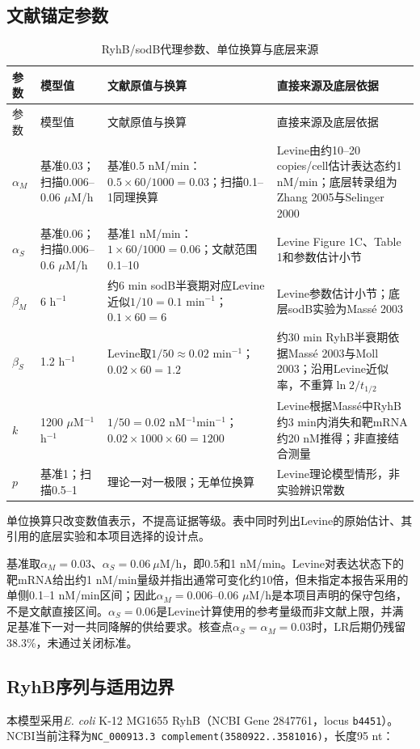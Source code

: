 \documentclass[UTF8,a4paper,11pt,fontset=windows]{ctexart}
\begin{document}
\subsection{文献锚定参数}
{\footnotesize
\begin{longtable}{@{}p{}p{}p{}p{}@{}}
\caption{RyhB/sodB代理参数、单位换算与底层来源}\\
\toprule
参数 & 模型值 & 文献原值与换算 & 直接来源及底层依据\\
\midrule
\endfirsthead
\toprule
参数 & 模型值 & 文献原值与换算 & 直接来源及底层依据\\\midrule
\endhead
$\alpha_M$ & 基准0.03；扫描0.006--0.06 $\mu$M/h & 基准0.5 nM/min：$0.5\times60/1000=0.03$；扫描0.1--1同理换算 & Levine由约10--20 copies/cell估计表达态约1 nM/min；底层转录组为Zhang 2005与Selinger 2000\\
$\alpha_S$ & 基准0.06；扫描0.006--0.6 $\mu$M/h & 基准1 nM/min：$1\times60/1000=0.06$；文献范围0.1--10 & Levine Figure 1C、Table 1和参数估计小节\\
$\beta_M$ & 6 h$^{-1}$ & 约6 min sodB半衰期对应Levine近似$1/10=0.1$ min$^{-1}$；$0.1\times60=6$ & Levine参数估计小节；底层sodB实验为Massé 2003\\
$\beta_S$ & 1.2 h$^{-1}$ & Levine取$1/50\approx0.02$ min$^{-1}$；$0.02\times60=1.2$ & 约30 min RyhB半衰期依据Massé 2003与Moll 2003；沿用Levine近似率，不重算$\ln2/t_{1/2}$\\
$k$ & 1200 $\mu$M$^{-1}$h$^{-1}$ & $1/50=0.02$ nM$^{-1}$min$^{-1}$；$0.02\times1000\times60=1200$ & Levine根据Massé中RyhB约3 min内消失和靶mRNA约20 nM推得；非直接结合测量\\
$p$ & 基准1；扫描0.5--1 & 理论一对一极限；无单位换算 & Levine理论模型情形，非实验辨识常数\\
\bottomrule
\end{longtable}}

单位换算只改变数值表示，不提高证据等级。表中同时列出Levine的原始估计、其引用的底层实验和本项目选择的设计点。

基准取$\alpha_M=0.03$、$\alpha_S=0.06\ \mu$M/h，即0.5和1 nM/min。Levine对表达状态下的靶mRNA给出约1 nM/min量级并指出通常可变化约10倍，但未指定本报告采用的单侧0.1--1 nM/min区间；因此$\alpha_M=0.006$--0.06 $\mu$M/h是本项目声明的保守包络，不是文献直接区间。$\alpha_S=0.06$是Levine计算使用的参考量级而非文献上限，并满足基准下一对一共同降解的供给要求。核查点$\alpha_S=\alpha_M=0.03$时，LR后期仍残留38.3\%，未通过关闭标准。

\subsection{RyhB序列与适用边界}
本模型采用\textit{E. coli} K-12 MG1655 RyhB（NCBI Gene 2847761，locus \nolinkurl{b4451}）。NCBI当前注释为\nolinkurl{NC_000913.3 complement(3580922..3581016)}，长度95 nt：
\end{document}
